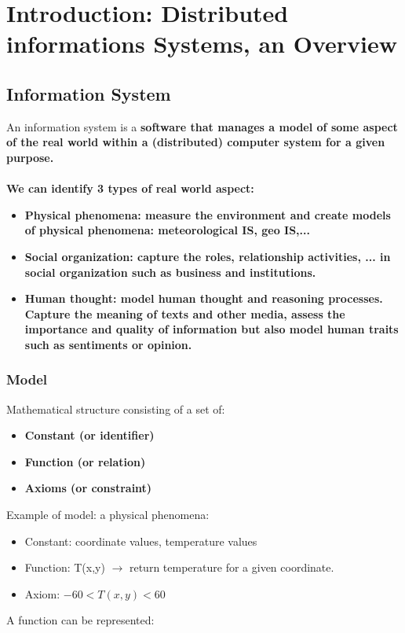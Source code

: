 \section{Introduction: Distributed informations Systems, an Overview}


\subsection{Information System}

An information system is a \bf{software} that manages a \bf{model} of some aspect of the \bf{real world} within a (distributed) computer system for a given \bf{purpose}.
\\
\\
We can identify 3 types of real world aspect:
\begin{itemize}
	\item \bf{Physical phenomena:} measure the environment and create models of physical phenomena: meteorological IS, geo IS,...
	\item \bf{Social organization:} capture the roles, relationship activities, ... in social organization such as business and institutions.
	\item \bf{Human thought:} model human thought and reasoning processes. Capture the meaning of texts and other media, assess the importance and quality of information but also model human traits such as sentiments or opinion.
\end{itemize}

\subsubsection{Model}
Mathematical structure consisting of a set of:
\begin{itemize}
\item \bf{Constant} (or identifier)
\item \bf{Function} (or relation)
\item \bf{Axioms} (or constraint)
\end{itemize}
Example of model: a physical phenomena:

\begin{itemize}
\item Constant: coordinate values, temperature values
\item Function: T(x,y) $\rightarrow$ return temperature for a given coordinate.
\item Axiom: $-60 < T(x,y) < 60$
\end{itemize}
A function can be represented:


